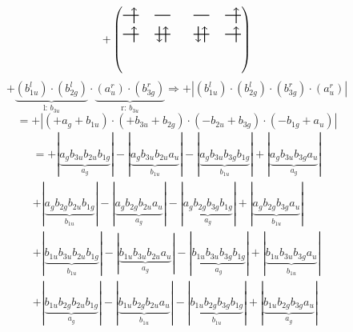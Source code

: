 \documentclass{article}
\begin{document}
\[+\left(\begin{tikzpicture}
    \draw[thick] (0,0) -- (0.5,0); %
    \draw[thick] (1,0) -- (1.5,0); %
    \draw[thick] (0,-0.6) -- (0.5,-0.6); %
    \draw[thick] (1,-0.6) -- (1.5,-0.6); %
\draw[->, thick] (0.35, -0.25) -- (0.35, 0.25); 
\draw[-> , thick] (0.35, -0.85) -- (0.35, -0.35); 
 \draw[-> , thick] (1.35, -0.85) -- (1.35, -0.35); 
\draw[<- , thick] (1.15, -0.85) -- (1.15, -0.35); 
\end{tikzpicture}\qquad \begin{tikzpicture}
    \draw[thick] (0,0) -- (0.5,0); %
    \draw[thick] (1,0) -- (1.5,0); %
    \draw[thick] (0,-0.6) -- (0.5,-0.6); %
    \draw[thick] (1,-0.6) -- (1.5,-0.6); %
\draw[->, thick] (1.35, -0.25) -- (1.35, 0.25); 
\draw[-> , thick] (0.35, -0.85) -- (0.35, -0.35); 
\draw[<- , thick] (0.15, -0.85) -- (0.15, -0.35); 
 \draw[-> , thick] (1.35, -0.85) -- (1.35, -0.35); 
\end{tikzpicture}\right)\]$$+ \underbrace{(b_{1u}^{l})\cdot (b_{2g}^{l})}_{\text{l: }b_{3u}}\cdot \underbrace{(a_{u}^{r})\cdot (b_{3g}^{r})}_{\text{r: }b_{3u}}\Rightarrow +\left|(b_{1u}^{l}) \cdot (b_{2g}^{l}) \cdot (b_{3g}^{r}) \cdot (a_{u}^{r})\right|$$$$=+\left|(+a_{g}+b_{1u}) \cdot (+b_{3u}+b_{2g}) \cdot (-b_{2u}+b_{3g}) \cdot (-b_{1g}+a_{u})\right|$$\begin{multline*}
=+\left|\underbrace{a_{g} b_{3u} b_{2u} b_{1g}}_{a_{g}}\right|-\left|\underbrace{a_{g} b_{3u} b_{2u} a_{u}}_{b_{1u}}\right|-\left|\underbrace{a_{g} b_{3u} b_{3g} b_{1g}}_{b_{1u}}\right|+\left|\underbrace{a_{g} b_{3u} b_{3g} a_{u}}_{a_{g}}\right|\\
+\left|\underbrace{a_{g} b_{2g} b_{2u} b_{1g}}_{b_{1u}}\right|-\left|\underbrace{a_{g} b_{2g} b_{2u} a_{u}}_{a_{g}}\right|-\left|\underbrace{a_{g} b_{2g} b_{3g} b_{1g}}_{a_{g}}\right|+\left|\underbrace{a_{g} b_{2g} b_{3g} a_{u}}_{b_{1u}}\right|\\
+\left|\underbrace{b_{1u} b_{3u} b_{2u} b_{1g}}_{b_{1u}}\right|-\left|\underbrace{b_{1u} b_{3u} b_{2u} a_{u}}_{a_{g}}\right|-\left|\underbrace{b_{1u} b_{3u} b_{3g} b_{1g}}_{a_{g}}\right|+\left|\underbrace{b_{1u} b_{3u} b_{3g} a_{u}}_{b_{1u}}\right|\\
+\left|\underbrace{b_{1u} b_{2g} b_{2u} b_{1g}}_{a_{g}}\right|-\left|\underbrace{b_{1u} b_{2g} b_{2u} a_{u}}_{b_{1u}}\right|-\left|\underbrace{b_{1u} b_{2g} b_{3g} b_{1g}}_{b_{1u}}\right|+\left|\underbrace{b_{1u} b_{2g} b_{3g} a_{u}}_{a_{g}}\right|

\end{multline*}
\end{document}
